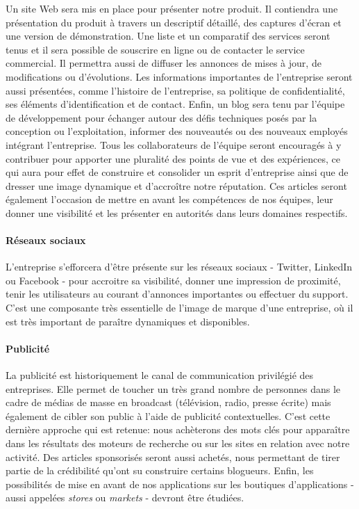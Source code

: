 \documentclass[10pt,twocolumn,a4paper,utf8x]{article}
\begin{document}
Un site Web sera mis en place pour présenter notre produit. Il
contiendra une présentation du produit à travers un descriptif détaillé,
des captures d'écran et une version de démonstration. Une liste et un
comparatif des services seront tenus et il sera possible de souscrire en
ligne ou de contacter le service commercial. Il permettra aussi de
diffuser les annonces de mises à jour, de modifications ou d'évolutions.
Les informations importantes de l'entreprise seront aussi présentées,
comme l'histoire de l'entreprise, sa politique de confidentialité, ses
éléments d'identification et de contact. Enfin, un blog sera tenu par
l'équipe de développement pour échanger autour des défis techniques
posés par la conception ou l'exploitation, informer des nouveautés ou
des nouveaux employés intégrant l'entreprise. Tous les collaborateurs de
l'équipe seront encouragés à y contribuer pour apporter une pluralité
des points de vue et des expériences, ce qui aura pour effet de
construire et consolider un esprit d'entreprise ainsi que de dresser une
image dynamique et d'accroître notre réputation. Ces articles seront
également l'occasion de mettre en avant les compétences de nos équipes,
leur donner une visibilité et les présenter en autorités dans leurs
domaines respectifs.

\paragraph{Réseaux sociaux}

L'entreprise s'efforcera d'être présente sur les réseaux sociaux -
Twitter, LinkedIn ou Facebook - pour accroitre sa visibilité, donner une
impression de proximité, tenir les utilisateurs au courant d'annonces
importantes ou effectuer du support. C'est une composante très
essentielle de l'image de marque d'une entreprise, où il est très
important de paraître dynamiques et disponibles.

\paragraph{Publicité}

La publicité est historiquement le canal de communication privilégié des
entreprises. Elle permet de toucher un très grand nombre de personnes
dans le cadre de médias de masse en broadcast (télévision, radio, presse
écrite) mais également de cibler son public à l'aide de publicité
contextuelles. C'est cette dernière approche qui est retenue: nous
achèterons des mots clés pour apparaître dans les résultats des moteurs
de recherche ou sur les sites en relation avec notre activité. Des
articles sponsorisés seront aussi achetés, nous permettant de tirer
partie de la crédibilité qu'ont su construire certains blogueurs. Enfin,
les possibilités de mise en avant de nos applications sur les boutiques
d'applications - aussi appelées \emph{stores} ou \emph{markets} -
devront être étudiées.
\end{document}
